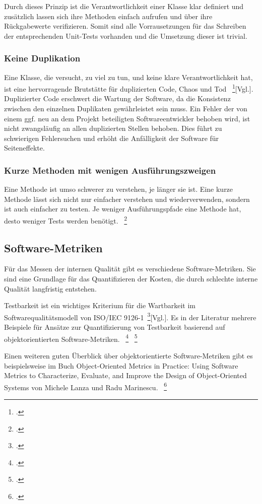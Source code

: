 Durch dieses Prinzip ist die Verantwortlichkeit einer Klasse klar definiert und zusätzlich lassen sich ihre Methoden einfach aufrufen und über ihre Rückgabewerte verifizieren. Somit sind alle Vorrausetzungen für das Schreiben der entsprechenden Unit-Tests vorhanden und die Umsetzung dieser ist trivial.

\subsubsection{Keine Duplikation}
Eine Klasse, die versucht, zu viel zu tun, und keine klare Verantwortlichkeit hat, ist eine
hervorragende Brutstätte für duplizierten Code, Chaos und Tod ~\footcite{Fowler.2000}[Vgl.]. Duplizierter Code erschwert die Wartung der Software, da die Konsistenz zwischen den einzelnen Duplikaten gewährleistet sein muss. Ein Fehler der von einem ggf. neu an dem Projekt beteiligten Softwareentwickler behoben wird, ist nicht zwangsläufig an allen duplizierten Stellen behoben. Dies führt zu schwierigen Fehlersuchen und erhöht die Anfälligkeit der Software für Seiteneffekte. 

\subsubsection{Kurze Methoden mit wenigen Ausführungszweigen}
Eine Methode ist umso schwerer zu verstehen, je länger sie ist. Eine kurze Methode lässt
sich nicht nur einfacher verstehen und wiederverwenden, sondern ist auch einfacher zu
testen. Je weniger Ausführungspfade eine Methode hat, desto weniger Tests werden benötigt. ~\footcite[Vgl. Seite 9]{Bergmann.2013}

\subsection{Software-Metriken}\label{software-metriken}
Für das Messen der internen Qualität gibt es verschiedene Software-Metriken. Sie sind eine Grundlage für das Quantifizieren der Kosten, die durch schlechte interne Qualität langfristig entstehen.

Testbarkeit ist ein wichtiges Kriterium für die Wartbarkeit im Softwarequalitätsmodell von ISO/IEC 9126-1~\footcite{ISOIEC91261}[Vgl.]. Es in der Literatur mehrere Beispiele für Ansätze zur Quantifizierung von Testbarkeit basierend auf objektorientierten Software-Metriken. ~\footcite[Vgl. Seite 136-145]{Bruntink.2004} ~\footcite[Vgl. Seite 1 - 6]{Khan.2009}

Einen weiteren guten Überblick über objektorientierte Software-Metriken gibt es beispielsweise im Buch \dq{}Object-Oriented Metrics in Practice: Using Software Metrics to Characterize, Evaluate, and Improve the Design of Object-Oriented Systems\dq{} von Michele Lanza und Radu Marinescu. ~\footcite[Vgl.]{Lanza.2006}

